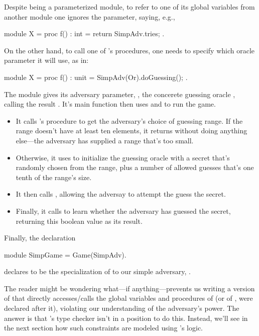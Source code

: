 Despite  being a parameterized module, to refer to one
of its global variables from another module one ignores the parameter,
saying, e.g.,
\begin{easycrypt}{}{}
module X = {
  proc f() : int = {
    return SimpAdv.tries;
  }
}.
\end{easycrypt}
On the other hand, to call one of 's procedures, one needs
to specify which oracle parameter it will use, as in:
\begin{easycrypt}{}{}
module X = {
  proc f() : unit = {
    SimpAdv(Or).doGuessing();
  }
}.
\end{easycrypt}

The module  gives its adversary parameter, , the
concerete guessing oracle , calling the result . It's
main function then uses  and  to run the game.
\begin{itemize}
\item It calls 's  procedure to get the adversary's
  choice of guessing range. If the range doesn't have at least ten elements,
  it returns  without doing anything else---the adversary
  has supplied a range that's too small.

\item Otherwise, it uses  to initialize the guessing
  oracle with a secret that's randomly chosen from the range, plus a
  number of allowed guesses that's one tenth of the range's size.

\item It then calls , allowing the adversay to
  attempt the guess the secret.

\item Finally, it calls  to learn whether the
  adversary has guessed the secret, returning this boolean
  value as its result.
\end{itemize}

Finally, the declaration
\begin{easycrypt}{}{}
module SimpGame = Game(SimpAdv).
\end{easycrypt}
declares  to be the specialization of  to
our simple adversary, .

The reader might be wondering what---if anything---prevents us writing
a version of  that directly accesses/calls the global
variables and procedures of  (or of , were 
declared after it), violating our understanding of the adversary's
power. The answer is that \EasyCrypt's type checker isn't in a position
to do this. Instead, we'll see in the next section how such
constraints are modeled using \EasyCrypt's logic.

